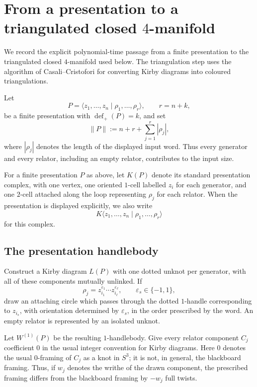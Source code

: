 \documentclass[a4paper,11pt,reqno]{amsart}
\theoremstyle{definition}
\theoremstyle{remark}
\newcommand{\defp}{\operatorname{def}_{+}}
\begin{document}
	\section{From a presentation to a triangulated closed
		\texorpdfstring{$4$}{4}-manifold}
	\label{sec:triangulation}
	
	We record the explicit polynomial-time passage from a finite presentation to
	the triangulated closed $4$-manifold used below. The triangulation step uses
	the algorithm of Casali--Cristofori \cite{CasaliCristofori} for converting Kirby diagrams into
	coloured triangulations.
	
	Let
	\[
	P=\langle z_1,\dots,z_n\mid \rho_1,\dots,\rho_r\rangle,
	\qquad r=n+k,
	\]
	be a finite presentation with $\defp(P)=k$, and set
	\[
	\|P\|:=n+r+\sum_{j=1}^{r}|\rho_j|,
	\]
	where $|\rho_j|$ denotes the length of the displayed input word.
	Thus every generator and every relator, including an empty relator,
	contributes to the input size.
	
	For a finite presentation $P$ as above,
	let $K(P)$ denote its standard presentation complex, with one vertex,
	one oriented $1$-cell labelled $z_i$ for each generator, and one
	$2$-cell attached along the loop representing $\rho_j$ for each
	relator. When the presentation is displayed explicitly, we also write
	\[
	K\langle z_1,\dots,z_n\mid \rho_1,\dots,\rho_r\rangle
	\]
	for this complex. 
	
	\subsection{The presentation handlebody}
	
	Construct a Kirby diagram $L(P)$ with one dotted unknot per generator, with all of these components mutually unlinked. If
	\[
	\rho_j=z_{i_1}^{\varepsilon_1}\cdots
	z_{i_\ell}^{\varepsilon_\ell},
	\qquad \varepsilon_s\in\{-1,1\},
	\]
	draw an attaching circle which passes through the dotted $1$-handle corresponding to
	$z_{i_s}$, with orientation determined by $\varepsilon_s$, in the order
	prescribed by the word. An empty relator is represented by an isolated
	unknot.
	
	Let $W^{(1)}(P)$ be the resulting $1$-handlebody. Give every
	relator component $C_j$ coefficient $0$ in the usual integer
	convention for Kirby diagrams. Here $0$ denotes the usual
	$0$-framing of $C_j$ as a knot in $S^3$; it is not, in general,
	the blackboard framing. Thus, if $w_j$ denotes the writhe of the
	drawn component, the prescribed framing differs from the blackboard
	framing by $-w_j$ full twists.
	
\end{document}
